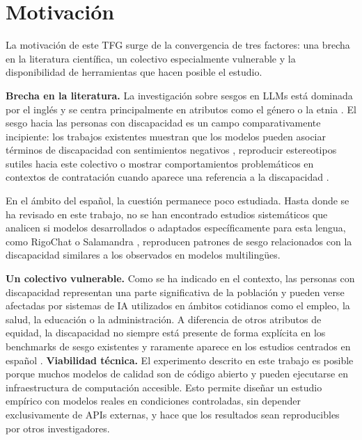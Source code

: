 \documentclass[12pt]{report} %
\renewcommand{\_}{\oldunderscore\allowbreak}
\begin{document}
\section{Motivación}

La motivación de este TFG surge de la convergencia de tres factores: una brecha en la literatura científica, un colectivo especialmente vulnerable y la disponibilidad de herramientas que hacen posible el estudio.


\textbf{Brecha en la literatura.} La investigación sobre sesgos en LLMs está dominada por el inglés y se centra principalmente en atributos como el género o la etnia \cite{guo2024bias, navigli2023biases}. El sesgo hacia las personas con discapacidad es un campo comparativamente incipiente: los trabajos existentes muestran que los modelos pueden asociar términos de discapacidad con sentimientos negativos \cite{venkit2022disability}, reproducir estereotipos sutiles hacia este colectivo \cite{gadiraju2023disability} o mostrar comportamientos problemáticos en contextos de contratación cuando aparece una referencia a la discapacidad \cite{kamruzzaman2025disclosure}. 

En el ámbito del español, la cuestión permanece poco estudiada. Hasta donde se ha revisado en este trabajo, no se han encontrado estudios sistemáticos que analicen si modelos desarrollados o adaptados específicamente para esta lengua, como RigoChat \cite{rigochat} o Salamandra \cite{salamandra}, reproducen patrones de sesgo relacionados con la discapacidad similares a los observados en modelos multilingües.

\textbf{Un colectivo vulnerable.} Como se ha indicado en el contexto, las personas con discapacidad representan una parte significativa de la población y pueden verse afectadas por sistemas de IA utilizados en ámbitos cotidianos como el empleo, la salud, la educación o la administración. A diferencia de otros atributos de equidad, la discapacidad no siempre está presente de forma explícita en los benchmarks de sesgo existentes \cite{beats2025} y raramente aparece en los estudios centrados en español \cite{sesgo2025}.
\textbf{Viabilidad técnica.} El experimento descrito en este trabajo es posible porque muchos modelos de calidad son de código abierto y pueden ejecutarse en infraestructura de computación accesible. Esto permite diseñar un estudio empírico con modelos reales en condiciones controladas, sin depender exclusivamente de APIs externas, y hace que los resultados sean reproducibles por otros investigadores.
\end{document}
